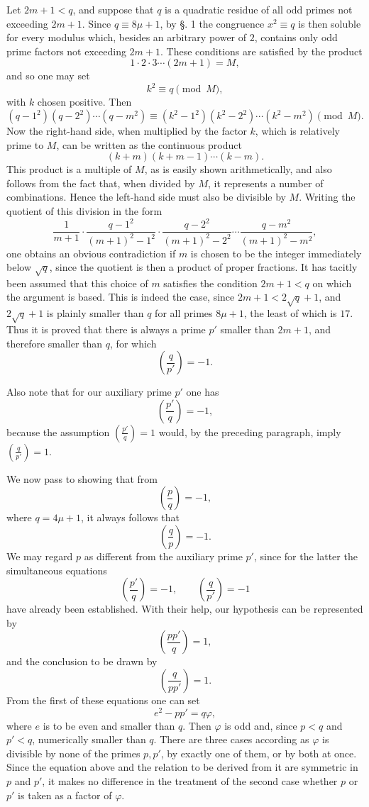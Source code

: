 \documentclass[11pt]{article}
\newcommand{\J}[2]{\left(\frac{#1}{#2}\right)}
\begin{document}
Let $2m+1<q$, and suppose that $q$ is a quadratic residue of all odd primes not exceeding $2m+1$. Since $q\equiv8\mu+1$, by \S. 1 the congruence $x^2\equiv q$ is then soluble for every modulus which, besides an arbitrary power of $2$, contains only odd prime factors not exceeding $2m+1$. These conditions are satisfied by the product
\[
 1\cdot2\cdot3\cdots(2m+1)=M,
\]
and so one may set
\[
 k^2\equiv q\pmod M,
\]
with $k$ chosen positive. Then
\[
 (q-1^2)(q-2^2)\cdots(q-m^2)\equiv(k^2-1^2)(k^2-2^2)\cdots(k^2-m^2)\pmod M.
\]
Now the right-hand side, when multiplied by the factor $k$, which is relatively prime to $M$, can be written as the continuous product
\[
 (k+m)(k+m-1)\cdots(k-m).
\]
This product is a multiple of $M$, as is easily shown arithmetically, and also follows from the fact that, when divided by $M$, it represents a number of combinations. Hence the left-hand side must also be divisible by $M$. Writing the quotient of this division in the form
\[
 \frac1{m+1}\cdot \frac{q-1^2}{(m+1)^2-1^2}\cdot
 \frac{q-2^2}{(m+1)^2-2^2}\cdots
 \frac{q-m^2}{(m+1)^2-m^2},
\]
one obtains an obvious contradiction if $m$ is chosen to be the integer immediately below $\sqrt q$, since the quotient is then a product of proper fractions. It has tacitly been assumed that this choice of $m$ satisfies the condition $2m+1<q$ on which the argument is based. This is indeed the case, since $2m+1<2\sqrt q+1$, and $2\sqrt q+1$ is plainly smaller than $q$ for all primes $8\mu+1$, the least of which is $17$. Thus it is proved that there is always a prime $p'$ smaller than $2m+1$, and therefore smaller than $q$, for which
\[
 \J{q}{p'}=-1.
\]

Also note that for our auxiliary prime $p'$ one has
\[
 \J{p'}{q}=-1,
\]
because the assumption $\J{p'}{q}=1$ would, by the preceding paragraph, imply $\J{q}{p'}=1$.

We now pass to showing that from
\[
 \J{p}{q}=-1,
\]
where $q=4\mu+1$, it always follows that
\[
 \J{q}{p}=-1.
\]
We may regard $p$ as different from the auxiliary prime $p'$, since for the latter the simultaneous equations
\[
 \J{p'}{q}=-1,
\qquad
 \J{q}{p'}=-1
\]
have already been established. With their help, our hypothesis can be represented by
\[
 \J{pp'}{q}=1,
\]
and the conclusion to be drawn by
\[
 \J{q}{pp'}=1.
\]
From the first of these equations one can set
\[
 e^2-pp'=q\varphi,
\]
where $e$ is to be even and smaller than $q$. Then $\varphi$ is odd and, since $p<q$ and $p'<q$, numerically smaller than $q$. There are three cases according as $\varphi$ is divisible by none of the primes $p,p'$, by exactly one of them, or by both at once. Since the equation above and the relation to be derived from it are symmetric in $p$ and $p'$, it makes no difference in the treatment of the second case whether $p$ or $p'$ is taken as a factor of $\varphi$.
\end{document}
